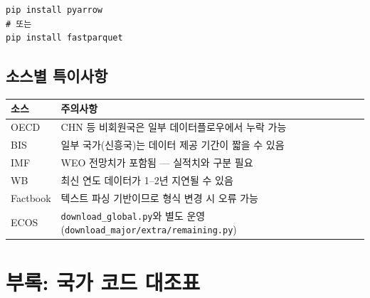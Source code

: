 \documentclass[11pt,a4paper]{article}
\newcommand{\code}[1]{\texttt{#1}}
\begin{document}
\begin{lstlisting}[style=bash]
pip install pyarrow
# 또는
pip install fastparquet
\end{lstlisting}

\subsection{소스별 특이사항}

\begin{table}[h]
\centering
\begin{tabularx}{\textwidth}{l X}
\toprule
\textbf{소스} & \textbf{주의사항} \\
\midrule
OECD & CHN 등 비회원국은 일부 데이터플로우에서 누락 가능 \\
BIS  & 일부 국가(신흥국)는 데이터 제공 기간이 짧을 수 있음 \\
IMF  & WEO 전망치가 포함됨 --- 실적치와 구분 필요 \\
WB   & 최신 연도 데이터가 1--2년 지연될 수 있음 \\
Factbook & 텍스트 파싱 기반이므로 형식 변경 시 오류 가능 \\
ECOS & \code{download\_global.py}와 별도 운영 (\code{download\_major/extra/remaining.py}) \\
\bottomrule
\end{tabularx}
\end{table}


\section{부록: 국가 코드 대조표}
\end{document}
